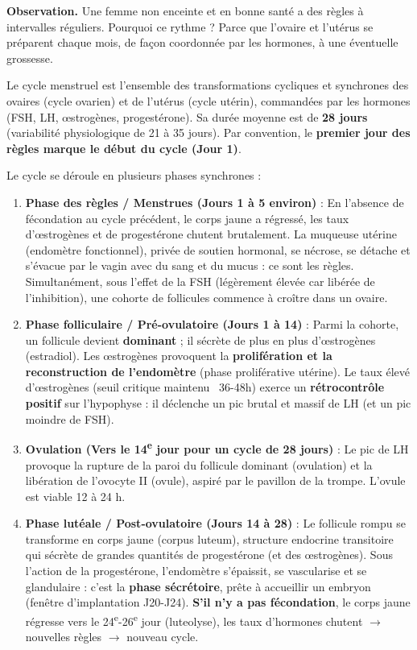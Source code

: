 \documentclass[11pt]{article}
\newcommand{\cle}[1]{{\popxbold\color{popdark}#1}}
\newcounter{popsec}
\newcounter{popsub}
\newcommand{\courssub}[1]{%
  \stepcounter{popsub}%
  \par\vspace{9pt}\noindent{\popxbold\fontsize{11.5}{13}\selectfont\color{popink}{\color{poporange}\thepopsec.\thepopsub}\hspace{6pt}#1}\par\nopagebreak\vspace{4pt}
}
\begin{document}
\courssub{Le cycle menstruel (ou cycle ovarien-utérin)}

\textbf{Observation.} Une femme non enceinte et en bonne santé a des règles à intervalles réguliers. Pourquoi ce rythme ? Parce que l'ovaire et l'utérus se préparent chaque mois, de façon coordonnée par les hormones, à une éventuelle grossesse.

\begin{definition}
Le \cle{cycle menstruel} est l'ensemble des transformations cycliques et synchrones des ovaires (cycle ovarien) et de l'utérus (cycle utérin), commandées par les hormones (FSH, LH, œstrogènes, progestérone). Sa durée moyenne est de \textbf{28 jours} (variabilité physiologique de 21 à 35 jours). Par convention, le \textbf{premier jour des règles marque le début du cycle (Jour 1)}.
\end{definition}

Le cycle se déroule en plusieurs phases synchrones :

\begin{enumerate}
\item \textbf{Phase des règles / Menstrues (Jours 1 à 5 environ)} : En l'absence de fécondation au cycle précédent, le corps jaune a régressé, les taux d'œstrogènes et de progestérone chutent brutalement. La muqueuse utérine (endomètre fonctionnel), privée de soutien hormonal, se nécrose, se détache et s'évacue par le vagin avec du sang et du mucus : ce sont les \cle{règles}. Simultanément, sous l'effet de la FSH (légèrement élevée car libérée de l'inhibition), une cohorte de follicules commence à croître dans un ovaire.
\item \textbf{Phase folliculaire / Pré-ovulatoire (Jours 1 à 14)} : Parmi la cohorte, un follicule devient \textbf{dominant} ; il sécrète de plus en plus d'\cle{œstrogènes} (estradiol). Les œstrogènes provoquent la \textbf{prolifération et la reconstruction de l'endomètre} (phase proliférative utérine). Le taux élevé d'œstrogènes (seuil critique maintenu ~36-48h) exerce un \textbf{rétrocontrôle positif} sur l'hypophyse : il déclenche un pic brutal et massif de \cle{LH} (et un pic moindre de FSH).
\item \textbf{Ovulation (Vers le 14\textsuperscript{e} jour pour un cycle de 28 jours)} : Le pic de LH provoque la rupture de la paroi du follicule dominant (ovulation) et la libération de l'ovocyte II (ovule), aspiré par le pavillon de la trompe. L'ovule est viable 12 à 24 h.
\item \textbf{Phase lutéale / Post-ovulatoire (Jours 14 à 28)} : Le follicule rompu se transforme en \cle{corps jaune} (corpus luteum), structure endocrine transitoire qui sécrète de grandes quantités de \cle{progestérone} (et des œstrogènes). Sous l'action de la progestérone, l'endomètre s'épaissit, se vascularise et se glandulaire : c'est la \textbf{phase sécrétoire}, prête à accueillir un embryon (fenêtre d'implantation J20-J24). \textbf{S'il n'y a pas fécondation}, le corps jaune régresse vers le 24\textsuperscript{e}-26\textsuperscript{e} jour (luteolyse), les taux d'hormones chutent $\to$ nouvelles règles $\to$ nouveau cycle.
\end{enumerate}
\end{document}
